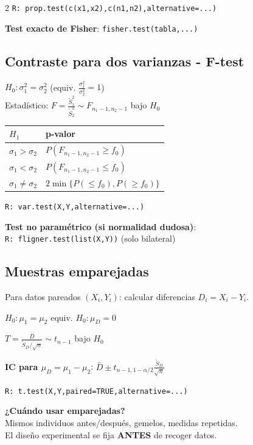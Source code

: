 \documentclass[9pt,a4paper]{article}
\newcommand{\R}{\texttt{R: }}
\begin{document}
\begin{multicols}{2}
\R\texttt{prop.test(c(x1,x2),c(n1,n2),alternative=...)}

\textbf{Test exacto de Fisher}: \texttt{fisher.test(tabla,...)}

\subsection{Contraste para dos varianzas - F-test}
$H_0:\sigma_1^2=\sigma_2^2$ (equiv. $\frac{\sigma_1^2}{\sigma_2^2}=1$)\\
Estadístico: $F=\frac{\tilde{S}_1^2}{\tilde{S}_2^2}\sim F_{n_1-1,n_2-1}$ bajo $H_0$

\begin{center}
\begin{tabular}{@{}l|l@{}}
$H_1$ & p-valor\\
\hline
$\sigma_1>\sigma_2$ & $P(F_{n_1-1,n_2-1}\geq f_0)$\\
$\sigma_1<\sigma_2$ & $P(F_{n_1-1,n_2-1}\leq f_0)$\\
$\sigma_1\neq\sigma_2$ & $2\min\{P(\leq f_0),P(\geq f_0)\}$
\end{tabular}
\end{center}

\R\texttt{var.test(X,Y,alternative=...)}

\textbf{Test no paramétrico (si normalidad dudosa)}:\\
\R\texttt{fligner.test(list(X,Y))} (solo bilateral)

\subsection{Muestras emparejadas}
Para datos pareados $(X_i,Y_i)$: calcular diferencias $D_i=X_i-Y_i$.

$H_0:\mu_1=\mu_2$ equiv. $H_0:\mu_D=0$
\begin{formulabox}
$T=\frac{\bar{D}}{\tilde{S}_D/\sqrt{n}}\sim t_{n-1}$ bajo $H_0$
\end{formulabox}

\textbf{IC para $\mu_D=\mu_1-\mu_2$}: $\bar{D}\pm t_{n-1,1-\alpha/2}\frac{\tilde{S}_D}{\sqrt{n}}$

\R\texttt{t.test(X,Y,paired=TRUE,alternative=...)}

\begin{alertbox}
\textbf{¿Cuándo usar emparejadas?}\\
Mismos individuos antes/después, gemelos, medidas repetidas.\\
El diseño experimental se fija \textbf{ANTES} de recoger datos.
\end{alertbox}


\end{multicols}
\end{document}
